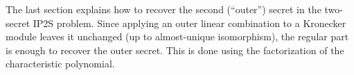 \documentclass{lms}
\begin{document}
% 
% 
% 
% 
% 
% 

The last section explains how to recover the second (``outer'') secret
in the two-secret IP2S problem.
Since applying an outer linear combination to a Kronecker module
leaves it unchanged (up to almost-unique isomorphism),
the regular part is enough to recover the outer secret.
This is done using the factorization of the characteristic polynomial.
\end{document}

